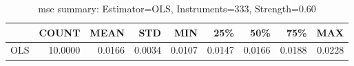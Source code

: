 \begin{table}[ht]
\centering
\caption{mse summary: Estimator=OLS, Instruments=333, Strength=0.60}
\begin{tabular}{lrrrrrrrr}
\toprule
 & COUNT & MEAN & STD & MIN & 25\% & 50\% & 75\% & MAX \\
\midrule
OLS & 10.0000 & 0.0166 & 0.0034 & 0.0107 & 0.0147 & 0.0166 & 0.0188 & 0.0228 \\
\bottomrule
\end{tabular}
\end{table}

